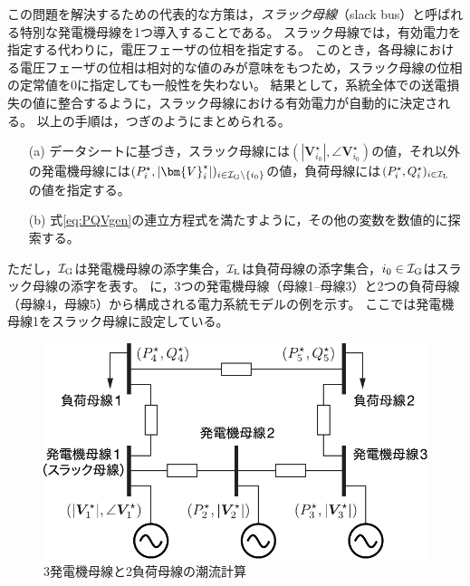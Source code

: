 \documentclass[tombow,dvipdfmx]{corona-a5-1.1}
\begin{document}
この問題を解決するための代表的な方策は，\emph{スラック母線}（slack bus）と呼ばれる特別な発電機母線を1つ導入することである。
スラック母線では，有効電力を指定する代わりに，電圧フェーザの位相を指定する。
このとき，各母線における電圧フェーザの位相は相対的な値のみが意味をもつため，スラック母線の位相の定常値を0に指定しても一般性を失わない。
結果として，系統全体での送電損失の値に整合するように，スラック母線における有効電力が自動的に決定される。
以上の手順は，つぎのようにまとめられる。
\begin{itemize}
\item[(a)] データシートに基づき，スラック母線には$(|\bm{V}_{i_0}^{\star}|,\angle \bm{V}_{i_0}^{\star})$の値，それ以外の発電機母線には$(P_i^{\star},|\bm{V}_{i}^{\star}|)_{i \in \mathcal{I}_{\rm G}\setminus\{i_0\} }$の値，負荷母線には$(P_i^{\star},Q_i^{\star})_{i \in \mathcal{I}_{\rm L}}$の値を指定する。
\item[(b)] 式\ref{eq:PQVgen}の連立方程式を満たすように，その他の変数を数値的に探索する。
\end{itemize}
ただし，$\mathcal{I}_{\rm G}$は発電機母線の添字集合，$\mathcal{I}_{\rm L}$は負荷母線の添字集合，$i_0 \in \mathcal{I}_{\rm G}$はスラック母線の添字を表す。
に，3つの発電機母線（母線1--母線3）と2つの負荷母線（母線4，母線5）から構成される電力系統モデルの例を示す。
ここでは発電機母線1をスラック母線に設定している。

\begin{figure}[t]
\centering
\includegraphics[width = .7\linewidth]{figs/powerflow}
\medskip
\caption{3発電機母線と2負荷母線の潮流計算}
\label{fig:powerflow}
\medskip
\end{figure}


\begin{例}[データシートに基づく潮流計算]
\end{例}



\begin{例}[経済性を考慮した潮流計算]\label{ex:pflow}
\end{例}
\end{document}
